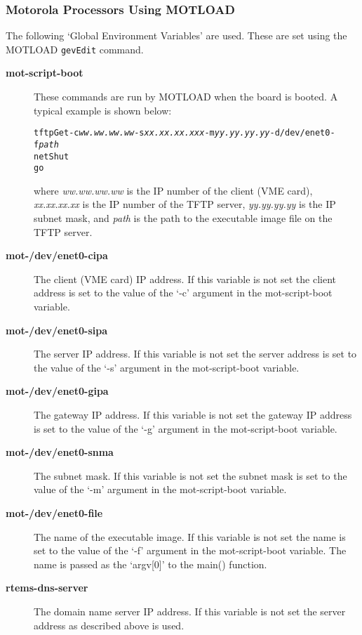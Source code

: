 \documentclass{report}
\begin{document}
\subsubsection{Motorola Processors Using MOTLOAD}
The following `Global Environment Variables' are used.  These are set using
the MOTLOAD {\tt gevEdit} command.
\begin{description}
\item[{\bf mot-script-boot}]
These commands are run by MOTLOAD when the board is booted.  A typical example is shown below:
\begin{alltt}
tftpGet -c\textit{ww.ww.ww.ww} -s\textit{xx.xx.xx.xxx} -m\textit{yy.yy.yy.yy} -d/dev/enet0 -f\textit{path}
netShut
go
\end{alltt}
where {\it ww.ww.ww.ww} is the IP number of the client (VME card),
{\it xx.xx.xx.xx} is the IP number of the TFTP server,
{\it yy.yy.yy.yy} is the IP subnet mask, and
{\it path} is the path to the executable image file on the TFTP server.

\item[{\bf mot-/dev/enet0-cipa}]
The client (VME card) IP address.  If this variable is not set the client address is 
set to the value of the `-c' argument in the mot-script-boot variable.

\item[{\bf mot-/dev/enet0-sipa}]
The server IP address.  If this variable is not set the server address is 
set to the value of the `-s' argument in the mot-script-boot variable.

\item[{\bf mot-/dev/enet0-gipa}]
The gateway IP address.  If this variable is not set the gateway IP address is 
set to the value of the `-g' argument in the mot-script-boot variable.

\item[{\bf mot-/dev/enet0-snma}]
The subnet mask.  If this variable is not set the subnet mask is 
set to the value of the `-m' argument in the mot-script-boot variable.

\item[{\bf mot-/dev/enet0-file}]
The name of the executable image.  If this variable is not set the name is 
set to the value of the `-f' argument in the mot-script-boot variable.
The name is passed as the `argv[0]' to the main() function.

\item[{\bf rtems-dns-server}]
The domain name server IP address.  If this variable is not set the server address as described above is used.


\end{description}
\end{document}
